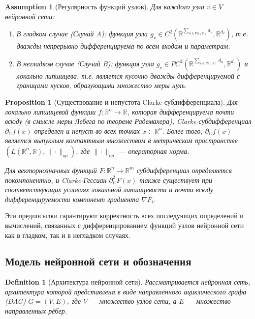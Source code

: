 \documentclass[11pt]{article}
\newtheorem{definition}{Definition}
\newtheorem{proposition}{Proposition}
\newtheorem{assumption}{Assumption}
\newcommand{\Pa}{\mathrm{Pa}} %
\begin{document}
\begin{assumption}[Регулярность функций узлов]
  \label{ass:regularity}
  Для каждого узла $v \in V$ нейронной сети:
  \begin{enumerate}
    \item В гладком случае (Случай A): функция узла $g_v \in C^2(\mathbb{R}^{\sum_{u\in\Pa(v)} d_u},
      \mathbb{R}^{d_v})$, т.е.
      дважды непрерывно дифференцируема по всем входам и параметрам.
    \item В негладком случае (Случай B): функция узла $g_v \in PC^2(\mathbb{R}^{\sum_{u\in\Pa(v)} d_u},
      \mathbb{R}^{d_v})$ и локально липшицева, т.е. является кусочно дважды
      дифференцируемой с границами кусков, образующими множество меры нуль.
  \end{enumerate}
\end{assumption}

\begin{proposition}[Существование и непустота Clarke-субдифференциала]
  \label{prop:clarke_existence}
  Для локально липшицевой функции $f: \mathbb{R}^n \to \mathbb{R}$, которая дифференцируема почти всюду (в
  смысле меры Лебега по теореме Радемахера), Clarke-субдифференциал $\partial_C f(x)$ определен и непуст во
  всех точках $x \in
  \mathbb{R}^n$. Более того, $\partial_C f(x)$ является выпуклым компактным множеством в метрическом
  пространстве $(L(\mathbb{R}^n, \mathbb{R}), \|\cdot\|_{op})$, где $\|\cdot\|_{op}$ — операторная норма.

  Для векторнозначных функций $F: \mathbb{R}^n \to \mathbb{R}^m$ субдифференциал определяется покомпонентно,
  и Clarke-Гессиан $\partial_C^2 F(x)$ также существует при соответствующих условиях локальной липшицевости и
  почти всюду дифференцируемости компонент градиента $\nabla F_i$.
\end{proposition}

Эти предпосылки гарантируют корректность всех последующих определений и вычислений, связанных с
дифференцированием функций узлов нейронной сети как в гладком, так и в негладком случаях.

\subsection{Модель нейронной сети и обозначения}

\begin{definition}[Архитектура нейронной сети]
  Рассматривается нейронная сеть, архитектура которой представлена в виде направленного ациклического графа
  (DAG) $G = (V, E)$, где $V$ — множество узлов сети, а $E$ — множество направленных рёбер.
\end{definition}
\end{document}
